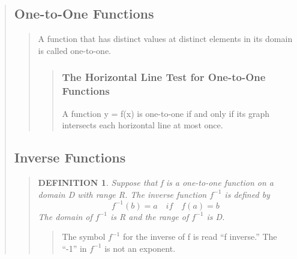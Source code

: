 \documentclass{report}
\newtheorem*{definition}{DEFINITION}
\begin{document}
\begin{quote}
	
	
	\subsection{One-to-One Functions}
	\begin{quote}

		A function that has distinct values at distinct elements in its domain is called one-to-one.
		
		\begin{quote}
			\subsubsection{The Horizontal Line Test for One-to-One Functions}
			
			A function y = ƒ(x) is one-to-one if and only if its graph intersects each horizontal line at most once.
		    
		\end{quote}
	\end{quote}
	
	
	
	\subsection{Inverse Functions}
	\begin{quote}
		

		\begin{definition}

			Suppose that ƒ is a one-to-one function on a domain D with range R.  The inverse function $f^{-1}$ is defined by
			$$f^{-1}(b) = a \quad if \quad f(a) = b$$
			The domain of $f^{-1}$ is R and the range of $f^{-1}$ is D.
		
		\end{definition}


		\begin{quote}


			\begin{warn}[Notice:]
				The symbol $f^{-1}$ for the inverse of ƒ is read “ƒ inverse.” The “-1” in $f^{-1}$ is not an exponent.
			\end{warn}
			

\end{quote}
\end{quote}
\end{quote}
\end{document}
